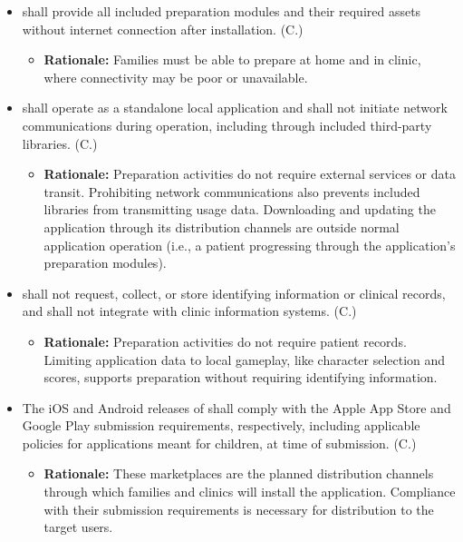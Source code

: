 \documentclass[12pt]{article}
\newcounter{connum} %
\begin{document}
\begin{itemize}
    \item \progname{} shall provide all included preparation modules and their
    required assets without internet connection after installation.
    (C.\theconnum\label{C_OfflineOperation})
    \begin{itemize}
        \item \textbf{Rationale:} Families must be able to prepare at home and
        in clinic, where connectivity may be poor or unavailable.
    \end{itemize}

    \item \progname{} shall operate as a standalone local application and shall
    not initiate network communications during operation, including
    through included third-party libraries.
    (C.\theconnum\label{C_NoNetworkCommunications})
    \begin{itemize}
        \item \textbf{Rationale:} Preparation activities do not require external
        services or data transit. Prohibiting network
        communications also prevents included libraries from transmitting usage
        data. Downloading and updating the application through its distribution
        channels are outside normal application operation (i.e., a patient progressing through the application's
        preparation modules).
    \end{itemize}

    \item \progname{} shall not request, collect, or store identifying
    information or clinical records, and shall not integrate with clinic
    information systems.
    (C.\theconnum\label{C_PatientPrivacy})
    \begin{itemize}
        \item \textbf{Rationale:} Preparation activities do not require patient
        records. Limiting application data to local gameplay, like character selection and scores,
        supports preparation without requiring identifying information.
    \end{itemize}

    \item The iOS and Android releases of \progname{} shall comply with the Apple App Store and Google Play submission
    requirements, respectively, including applicable policies for applications meant for children, at time of submission.
    (C.\theconnum\label{C_StoreCompliance})
    \begin{itemize}
        \item \textbf{Rationale:} These marketplaces are the planned distribution
        channels through which families and clinics will install the application. Compliance
        with their submission requirements is necessary for distribution to the target users.
    \end{itemize}
\end{itemize}
\end{document}
